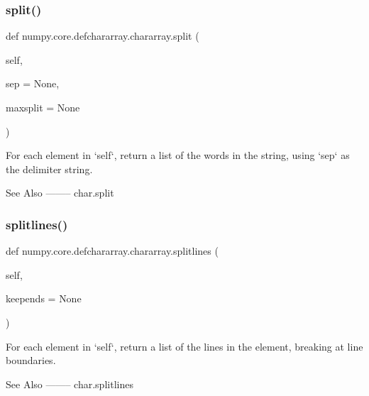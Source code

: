 \subsubsection{\texorpdfstring{split()}{split()}}
{\footnotesize\ttfamily def numpy.\+core.\+defchararray.\+chararray.\+split (\begin{DoxyParamCaption}\item[{}]{self,  }\item[{}]{sep = {\ttfamily None},  }\item[{}]{maxsplit = {\ttfamily None} }\end{DoxyParamCaption})}

\begin{DoxyVerb}For each element in `self`, return a list of the words in the
string, using `sep` as the delimiter string.

See Also
--------
char.split\end{DoxyVerb}
 \mbox{\label{classnumpy_1_1core_1_1defchararray_1_1chararray_a8faa6092e9754e3b398362d4ded24949}} 
\subsubsection{\texorpdfstring{splitlines()}{splitlines()}}
{\footnotesize\ttfamily def numpy.\+core.\+defchararray.\+chararray.\+splitlines (\begin{DoxyParamCaption}\item[{}]{self,  }\item[{}]{keepends = {\ttfamily None} }\end{DoxyParamCaption})}

\begin{DoxyVerb}For each element in `self`, return a list of the lines in the
element, breaking at line boundaries.

See Also
--------
char.splitlines\end{DoxyVerb}
 \mbox{\label{classnumpy_1_1core_1_1defchararray_1_1chararray_ae93919492938385cb258c999d02e09f4}} 
